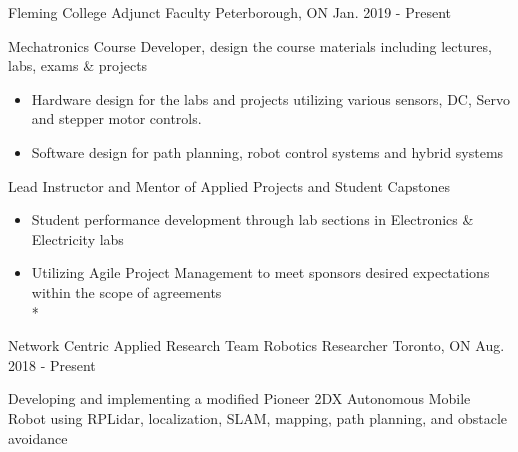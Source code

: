 

\begin{cventries}

  \cventry
    {Fleming College} %
    {Adjunct Faculty} %
    {Peterborough, ON} %
    {Jan. 2019 - Present} %
    {
      \begin{cvitems} %
        \item Mechatronics Course Developer, design the course materials including lectures, labs, exams \& projects
            \begin{itemize}
                \item Hardware design for the labs and projects utilizing various sensors, DC, Servo and stepper motor controls.
                \item Software design for path planning, robot control systems and hybrid systems
            \end{itemize}
        \item Lead Instructor and Mentor of Applied Projects and Student Capstones
            \begin{itemize}
        		\item Student performance development through lab sections in Electronics \& Electricity labs
        		\item Utilizing Agile Project Management to meet sponsors desired expectations within the scope of agreements
        		\\*
            \end{itemize}
      \end{cvitems}
    }
  \cventry
    {Network Centric Applied Research Team} %
    {Robotics Researcher} %
    {Toronto, ON} %
    {Aug. 2018 - Present} %
    {
      \begin{cvitems} %
        \item Developing and implementing a modified Pioneer 2DX Autonomous Mobile Robot using RPLidar, localization, SLAM, mapping, path planning, and obstacle avoidance

\end{cvitems}}
\end{cventries}
